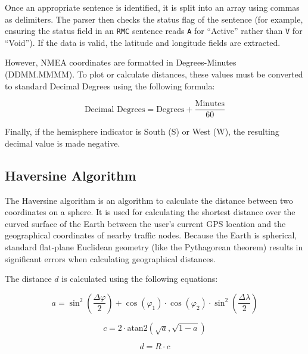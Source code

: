 Once an appropriate sentence is identified, it is split into an array using commas as delimiters. The parser then checks the status flag of the sentence (for example, ensuring the status field in an \texttt{RMC} sentence reads \texttt{A} for ``Active'' rather than \texttt{V} for ``Void''). If the data is valid, the latitude and longitude fields are extracted. 

However, NMEA coordinates are formatted in Degrees-Minutes (DDMM.MMMM). To plot or calculate distances, these values must be converted to standard Decimal Degrees using the following formula:

\begin{equation}
\text{Decimal Degrees} = \text{Degrees} + \frac{\text{Minutes}}{60}
\end{equation}

Finally, if the hemisphere indicator is South (S) or West (W), the resulting decimal value is made negative.

\subsection{Haversine Algorithm}

The Haversine algorithm is an algorithm to calculate the distance between two coordinates on a sphere. It is used for calculating the shortest distance over the curved surface of the Earth between the user's current GPS location and the geographical coordinates of nearby traffic nodes. Because the Earth is spherical, standard flat-plane Euclidean geometry (like the Pythagorean theorem) results in significant errors when calculating geographical distances.

The distance $d$ is calculated using the following equations:

\begin{equation}
a = \sin^2\left(\frac{\Delta \varphi}{2}\right) + \cos(\varphi_1) \cdot \cos(\varphi_2) \cdot \sin^2\left(\frac{\Delta \lambda}{2}\right)
\end{equation}

\begin{equation}
c = 2 \cdot \text{atan2}\left(\sqrt{a}, \sqrt{1-a}\right)
\end{equation}

\begin{equation}
d = R \cdot c
\end{equation}

